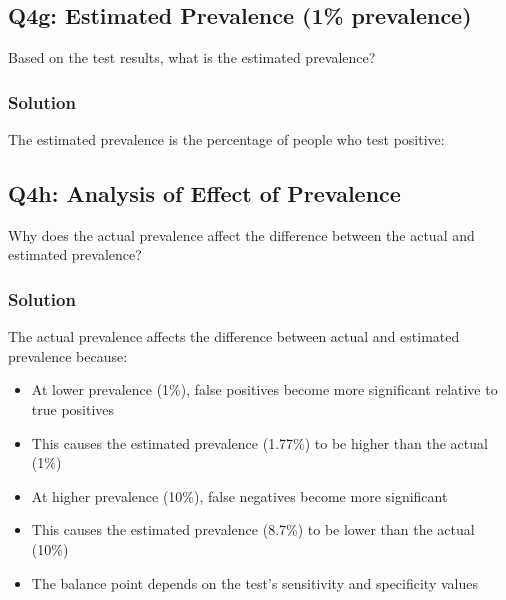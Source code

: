 \documentclass{article}
\begin{document}
\subsection*{Q4g: Estimated Prevalence (1\% prevalence)}

Based on the test results, what is the estimated prevalence?

\subsubsection*{Solution}

The estimated prevalence is the percentage of people who test positive:


\subsection*{Q4h: Analysis of Effect of Prevalence}

Why does the actual prevalence affect the difference between the actual and estimated prevalence?

\subsubsection*{Solution}

The actual prevalence affects the difference between actual and estimated prevalence because:
\begin{itemize}
    \item At lower prevalence (1\%), false positives become more significant relative to true positives
    \item This causes the estimated prevalence (1.77\%) to be higher than the actual (1\%)
    \item At higher prevalence (10\%), false negatives become more significant 
    \item This causes the estimated prevalence (8.7\%) to be lower than the actual (10\%)
    \item The balance point depends on the test's sensitivity and specificity values
\end{itemize}
\end{document}
